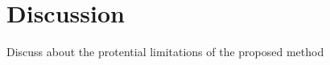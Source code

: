 

\section{Discussion}\label{sec:discussion}

Discuss about the protential limitations of the proposed method